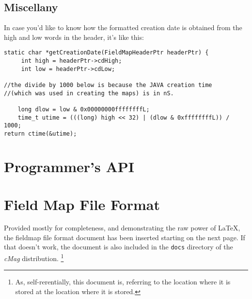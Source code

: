 \documentclass{article}
\begin{document}
\subsection {Miscellany}
In case you'd like to know how the formatted creation date is obtained from the high and low words in the header, it's like this:
\begin{verbatim}
static char *getCreationDate(FieldMapHeaderPtr headerPtr) {
     int high = headerPtr->cdHigh;
     int low = headerPtr->cdLow;

//the divide by 1000 below is because the JAVA creation time 
//(which was used in creating the maps) is in nS.

    long dlow = low & 0x00000000ffffffffL;
    time_t utime = (((long) high << 32) | (dlow & 0xffffffffL)) / 1000;
return ctime(&utime);

\end{verbatim}

\newpage
\appendix
\section{Programmer's API}
\newpage
\section{Field Map File Format}
Provided mostly for completeness, and demonstrating the raw power of \LaTeX, the fieldmap file format document has been inserted starting on the next page. If that doesn't work, the document is also included in the  \texttt{docs} directory of the \textit{cMag} distribution. \footnote{ As, self-rerentially, this document is, referring to the location where it is stored at the location where it is stored.}

\end{document}
